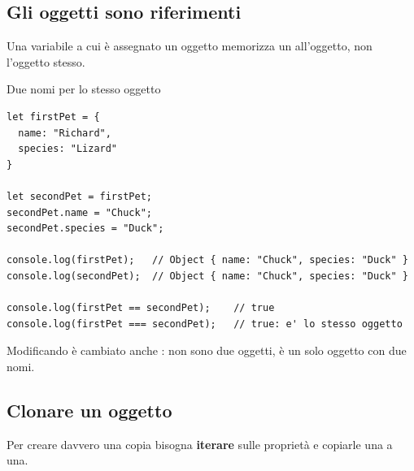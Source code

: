 \subsection{Gli oggetti sono riferimenti}

Una variabile a cui è assegnato un oggetto memorizza un 
all'oggetto, non l'oggetto stesso.

\begin{esempio}{Due nomi per lo stesso oggetto}
\begin{affianco}[0.57][c]
\codicepiccolo
\begin{lstlisting}[style=js, name=riferimenti.js]
let firstPet = {
  name: "Richard",
  species: "Lizard"
}

let secondPet = firstPet;
secondPet.name = "Chuck";
secondPet.species = "Duck";

console.log(firstPet);   // Object { name: "Chuck", species: "Duck" }
console.log(secondPet);  // Object { name: "Chuck", species: "Duck" }

console.log(firstPet == secondPet);    // true
console.log(firstPet === secondPet);   // true: e' lo stesso oggetto
\end{lstlisting}
\risultato
\begin{immagine}
\end{immagine}
\end{affianco}

Modificando  è cambiato anche : non sono due
oggetti, è un solo oggetto con due nomi.
\end{esempio}

\subsection{Clonare un oggetto}

Per creare davvero una copia bisogna \textbf{iterare} sulle proprietà e
copiarle una a una.

